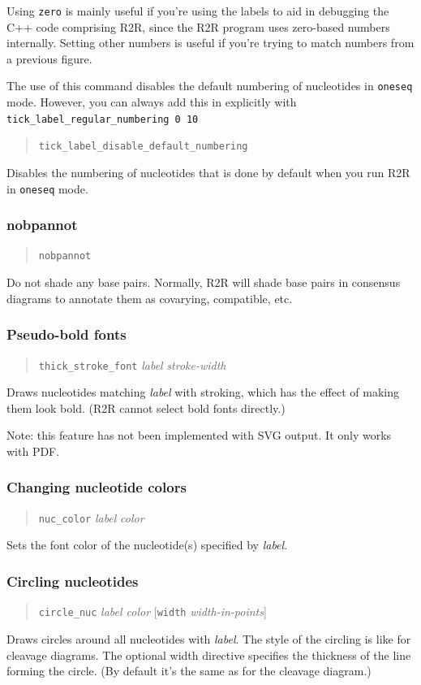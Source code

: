 \documentclass[letterpaper,12pt]{report}
\newcommand{\example}[1]{
\begin{quote}
{\raggedright
#1
}
\end{quote}
}
\begin{document}
Using {\tt zero} is mainly useful if you{\textquoteright}re using the
labels to aid in debugging the C++ code comprising R2R, since the R2R program uses zero-based numbers
internally.
Setting other numbers is useful if you're trying to match numbers from a previous figure.

The use of this command disables the default numbering of nucleotides in {\tt oneseq} mode.  However, you can always add this in explicitly with {\tt tick\_label\_regular\_numbering 0 10}

\example{{\tt tick\_label\_disable\_default\_numbering}}

Disables the numbering of nucleotides that is done by default when you run R2R in {\tt oneseq} mode.
\subsubsection{nobpannot}
\example{{\tt nobpannot}}

Do not shade any base pairs.  Normally, R2R will shade base pairs in consensus diagrams to annotate them as covarying, compatible, etc.

\subsubsection{Pseudo-bold fonts}
\example{
{\tt thick\_stroke\_font}  {\it label}  {\it stroke-width}
}

Draws nucleotides matching {\it label} with stroking, which has the effect of making them look bold.
(R2R cannot select bold fonts directly.)

Note: this feature has not been implemented with SVG output.  It only works with PDF.

\subsubsection{Changing nucleotide colors}
\label{sec:nuccolor}
\example{
{\tt nuc\_color} {\it label} {\it color}
}
Sets the font color of the nucleotide(s) specified by {\it label}.

\subsubsection{Circling nucleotides}
\example{{\tt circle\_nuc}  \textit{label  color }[{\tt width}\textit{ width-in-points}]}

Draws circles around all nucleotides with \textit{label}. The style of
the circling is like for cleavage diagrams.  The optional width 
directive specifies the thickness of the line forming the circle. (By
default it{\textquoteright}s the same as for the cleavage diagram.)
\end{document}
